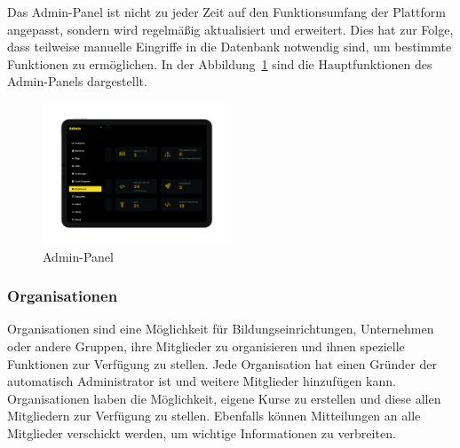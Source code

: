 \documentclass[main.tex]{subfiles}
\begin{document}
    Das Admin-Panel ist nicht zu jeder Zeit auf den Funktionsumfang der Plattform angepasst, sondern wird regelmäßig aktualisiert und erweitert.
    Dies hat zur Folge, dass teilweise manuelle Eingriffe in die Datenbank notwendig sind, um bestimmte Funktionen zu ermöglichen.
    In der Abbildung~\ref{fig:admin-panel} sind die Hauptfunktionen des Admin-Panels dargestellt.
    \begin{figure}[h]
        \centering
        \includegraphics[width=0.5\textwidth]{assets/admin-panel}
        \caption{Admin-Panel}
        \label{fig:admin-panel}
    \end{figure}
    \subsubsection{Organisationen}
    Organisationen sind eine Möglichkeit für Bildungseinrichtungen, Unternehmen oder andere Gruppen, ihre Mitglieder zu organisieren und ihnen spezielle Funktionen zur Verfügung zu stellen.
    Jede Organisation hat einen Gründer der automatisch Administrator ist und weitere Mitglieder hinzufügen kann.
    Organisationen haben die Möglichkeit, eigene Kurse zu erstellen und diese allen Mitgliedern zur Verfügung zu stellen.
    Ebenfalls können Mitteilungen an alle Mitglieder verschickt werden, um wichtige Informationen zu verbreiten.
\end{document}
